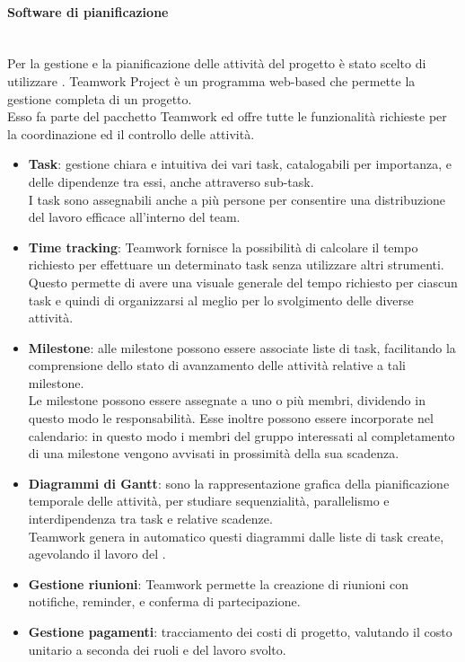 \paragraph{Software di pianificazione} \label{sec:teamwork}\mbox{}\\
Per la gestione e la pianificazione delle attività del progetto è stato scelto di utilizzare . Teamwork Project è un programma web-based che permette la gestione completa di un progetto.\\
Esso fa parte del pacchetto Teamwork ed offre tutte le funzionalità richieste per la coordinazione ed il controllo delle attività.
\begin{itemize}
	\item \textbf{Task}:
	gestione chiara e intuitiva dei vari task, catalogabili per importanza, e delle dipendenze tra essi, anche attraverso sub-task.\\
	I task sono assegnabili anche a più persone per consentire una distribuzione del lavoro efficace all'interno del team.
	
	\item \textbf{Time tracking}:
	Teamwork fornisce la possibilità di calcolare il tempo richiesto per effettuare un determinato task senza utilizzare altri strumenti. Questo permette di avere una visuale generale del tempo richiesto per ciascun task e quindi di organizzarsi al meglio per lo svolgimento delle diverse attività.
	
	\item \textbf{Milestone}:
	alle milestone possono essere associate liste di task, facilitando la comprensione dello stato di avanzamento delle attività relative a tali milestone.\\
	Le milestone possono essere assegnate a uno o più membri, dividendo in questo modo le responsabilità. Esse inoltre possono essere incorporate nel calendario: in questo modo i membri del gruppo interessati al completamento di una milestone vengono avvisati in prossimità della sua scadenza.
	
	\item \textbf{Diagrammi di Gantt}:	
	sono la rappresentazione grafica della pianificazione temporale delle attività, per studiare sequenzialità, parallelismo e interdipendenza tra task e relative scadenze.\\
	Teamwork genera in automatico questi diagrammi dalle liste di task create, agevolando il lavoro del \Responsabile.
	
	\item \textbf{Gestione riunioni}:
	Teamwork permette la creazione di riunioni con notifiche, reminder, e conferma di partecipazione.
	
	\item \textbf{Gestione pagamenti}:
	tracciamento dei costi di progetto, valutando il costo unitario a seconda dei ruoli e del lavoro svolto.
\end{itemize}

